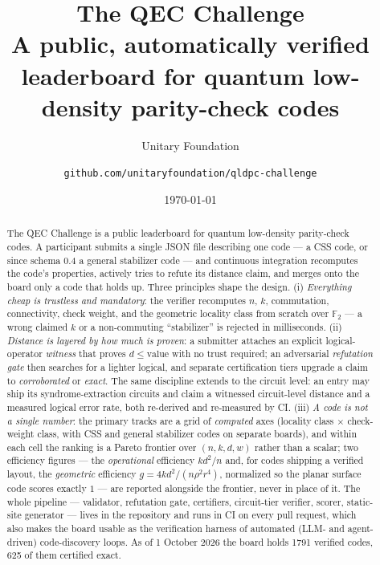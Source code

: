 \documentclass[11pt]{article}
\title{\textbf{The QEC Challenge}\\[4pt]
	\large A public, automatically verified leaderboard for quantum
	low-density parity-check codes}
\author{Unitary Foundation \and
	\texttt{github.com/unitaryfoundation/qldpc-challenge}}
\date{\vspace{-2ex}\today}
\newcommand{\GF}{\mathbb{F}_2}
\newcommand{\eff}{kd^2/n}
\newcommand{\geff}{4kd^2/(n\rho^2 r^4)}
\begin{document}
	\maketitle

	\begin{abstract}
		The QEC Challenge is a public leaderboard for quantum low-density
		parity-check codes. A participant submits a single JSON file describing
		one code --- a CSS code, or since schema 0.4 a general stabilizer code
		--- and continuous integration recomputes the code's properties,
		actively tries to refute its distance claim, and merges onto the board
		only a code that holds up. Three principles shape the design.
		(i) \emph{Everything cheap is trustless and mandatory}: the verifier
		recomputes $n$, $k$, commutation, connectivity, check weight, and the
		geometric locality class from scratch over $\GF$ --- a wrong claimed
		$k$ or a non-commuting ``stabilizer'' is rejected in milliseconds. (ii)
		\emph{Distance is layered by how much is proven}: a submitter attaches
		an explicit logical-operator \emph{witness} that proves
		$d\le\text{value}$ with no trust required; an adversarial
		\emph{refutation gate} then searches for a lighter logical, and
		separate certification tiers upgrade a claim to \emph{corroborated} or
		\emph{exact}. The same discipline extends to the circuit level: an
		entry may ship its syndrome-extraction circuits and claim a
		witnessed circuit-level distance and a measured logical error rate,
		both re-derived and re-measured by CI. (iii) \emph{A code is not a
		single number}: the primary tracks are a grid of \emph{computed} axes
		(locality class $\times$ check-weight class, with CSS and general
		stabilizer codes on separate boards), and within each cell the
		ranking is a Pareto frontier over $(n,k,d,w)$ rather than a scalar;
		two efficiency figures --- the \emph{operational} efficiency $\eff$
		and, for codes shipping a verified layout, the \emph{geometric}
		efficiency $g=\geff$, normalized so the planar surface code scores
		exactly $1$ --- are reported alongside the frontier, never in place
		of it. The whole pipeline --- validator, refutation gate, certifiers,
		circuit-tier verifier, scorer, static-site generator --- lives in the
		repository and runs in CI on every pull request, which also makes the
		board usable as the verification harness of automated (LLM- and
		agent-driven) code-discovery loops. As of 1 October 2026 the board
		holds 1791 verified codes, 625 of them certified exact.
	\end{abstract}
\end{document}
